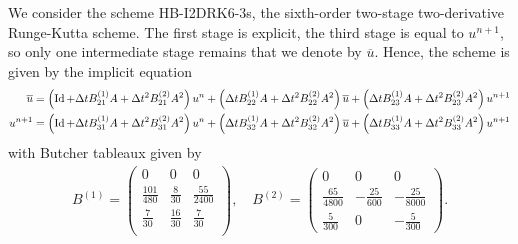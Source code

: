 \documentclass[]{scrartcl}
\numberwithin{equation}{section}
\begin{document}
We consider the scheme HB-I2DRK6-3s, the sixth-order two-stage two-derivative Runge-Kutta scheme.
The first stage is explicit, the third stage is equal to $u^{n+1}$, so only one intermediate stage remains that we denote by $\overline u$.
%
Hence, the scheme is given by the implicit equation
%
\newcommand{\ynn}{u^{n+1}}
\newcommand{\yn}{u^n}
\begin{align*}
 \overline u &= \left(\Id + \dt B^{(1)}_{21} A + \dt^2 B^{(2)}_{21} A^2\right) \yn +
 \left(\dt B^{(1)}_{22} A + \dt^2 B^{(2)}_{22} A^2 \right) \overline u + \left(\dt B^{(1)}_{23} A + \dt^2 B^{(2)}_{23} A^2 \right) \ynn \\
 \ynn &= \left(\Id + \dt B^{(1)}_{31} A + \dt^2 B^{(2)}_{31} A^2\right) \yn +
 \left(\dt B^{(1)}_{32} A + \dt^2 B^{(2)}_{32} A^2 \right) \overline u + \left(\dt B^{(1)}_{33} A + \dt^2 B^{(2)}_{33} A^2 \right) \ynn
\end{align*}
%
with Butcher tableaux given by
 \begin{align}\label{eq:butcher6}
        B^{(1)} =
        \begin{pmatrix}
        0 & 0 & 0 \\[0.5em]
        \frac{101}{480} & \frac{8}{30} & \frac{55}{2400} \\[0.5em]
        \frac{7}{30} & \frac{16}{30} & \frac{7}{30} \\
        \end{pmatrix}, \quad
        B^{(2)} =
        \begin{pmatrix}
        0 & 0 & 0  \\[0.5em]
        \frac{65}{4800} & -\frac{25}{600} &  -\frac{25}{8000} \\[0.5em]
        \frac{5} {300} & 0 &  -\frac{5}{300}
        \end{pmatrix}.
\end{align}
\end{document}
